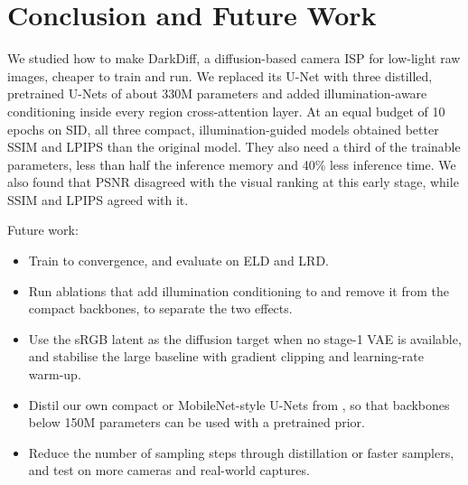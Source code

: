 \section{Conclusion and Future Work}
\label{sec:conclusion}

We studied how to make DarkDiff, a diffusion-based camera ISP for low-light raw images, cheaper
to train and run. We replaced its \sdtwo{} U-Net with three distilled, pretrained U-Nets of about
330M parameters and added illumination-aware conditioning inside every region cross-attention
layer. At an equal budget of 10 epochs on SID, all three compact, illumination-guided models
obtained better SSIM and LPIPS than the original model. They also need a third of the trainable
parameters, less than half the inference memory and 40\% less inference time. We also found that
PSNR disagreed with the visual ranking at this early stage, while SSIM and LPIPS agreed with it.

Future work:
\begin{itemize}
  \item Train to convergence, and evaluate on ELD and LRD.
  \item Run ablations that add illumination conditioning to \sdtwo{} and remove it from the compact
        backbones, to separate the two effects.
  \item Use the sRGB latent as the diffusion target when no stage-1 VAE is available, and stabilise
        the large baseline with gradient clipping and learning-rate warm-up.
  \item Distil our own compact or MobileNet-style U-Nets from \sdtwo{}, so that backbones below
        150M parameters can be used with a pretrained prior.
  \item Reduce the number of sampling steps through distillation or faster samplers, and test on
        more cameras and real-world captures.
\end{itemize}
